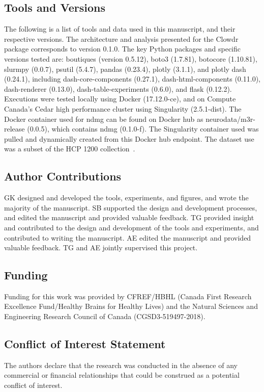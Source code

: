 \documentclass[fleqn,12pt]{SelfArx_ch} %
\begin{document}
\subsection*{Tools and Versions}
The following is a list of tools and data used in this manuscript, and their respective versions. The architecture and
analysis presented for the Clowdr package corresponds to version 0.1.0. The key Python packages and specific versions
tested are: boutiques (version 0.5.12), boto3 (1.7.81), botocore (1.10.81), slurmpy (0.0.7), psutil (5.4.7), pandas
(0.23.4), plotly (3.1.1), and plotly dash (0.24.1), including dash-core-components (0.27.1), dash-html-components
(0.11.0), dash-renderer (0.13.0), dash-table-experiments (0.6.0), and flask (0.12.2). Executions were tested locally
using Docker (17.12.0-ce), and on Compute Canada’s Cedar high performance cluster using Singularity (2.5.1-dist). The
Docker container used for ndmg can be found on Docker hub as neurodata/m3r-release (0.0.5), which contains ndmg
(0.1.0-f). The Singularity container used was pulled and dynamically created from this Docker hub endpoint. The dataset
use was a subset of the HCP 1200 collection~\cite{Van_Essen2013-bx}.

\subsection*{Author Contributions}
GK designed and developed the tools, experiments, and figures, and wrote the majority of the manuscript. SB supported
the design and development processes, and edited the manuscript and provided valuable feedback. TG provided insight and
contributed to the design and development of the tools and experiments, and contributed to writing the manuscript. AE
edited the manuscript and provided valuable feedback. TG and AE jointly supervised this project.

\subsection*{Funding}
Funding for this work was provided by CFREF/HBHL (Canada First Research Excellence Fund/Healthy Brains for Healthy
Lives) and the Natural Sciences and Engineering Research Council of Canada (CGSD3-519497-2018).

\subsection*{Conflict of Interest Statement}
The authors declare that the research was conducted in the absence of any commercial or financial relationships that
could be construed as a potential conflict of interest.
\end{document}
